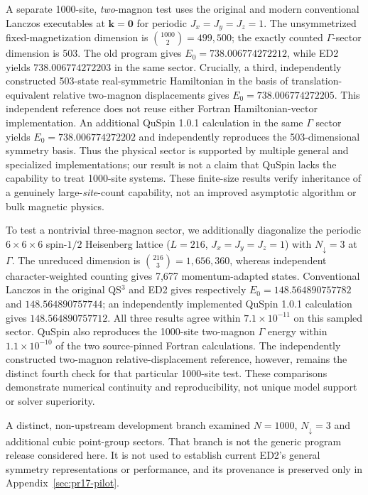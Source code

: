 \documentclass[preprint,12pt,nopreprintline]{elsarticle}
\begin{document}
A separate 1000-site, \emph{two}-magnon test uses the
original and modern conventional Lanczos executables
at $\bm k=\bm0$ for periodic $J_x=J_y=J_z=1$.
The unsymmetrized fixed-magnetization dimension is
$\binom{1000}{2}=499{,}500$; the exactly counted
$\Gamma$-sector dimension is 503.
The old program gives $E_0=738.006774272212$, while
ED2 yields $738.006774272203$ in the same sector.
Crucially, a third, independently constructed
503-state real-symmetric Hamiltonian in the basis
of translation-equivalent relative two-magnon
displacements gives $E_0=738.006774272205$.
This independent reference does not reuse either
Fortran Hamiltonian-vector implementation.
An additional QuSpin 1.0.1 calculation in the same
$\Gamma$ sector yields $E_0=738.006774272202$
and independently reproduces the 503-dimensional
symmetry basis. Thus the physical sector is supported
by multiple general and specialized implementations;
our result is not a claim that QuSpin lacks the
capability to treat 1000-site systems.
These finite-size results verify inheritance of
a genuinely large-\emph{site}-count capability,
not an improved asymptotic algorithm or bulk
magnetic physics.


To test a nontrivial three-magnon sector, we additionally
diagonalize the periodic $6\times6\times6$ spin-$1/2$
Heisenberg lattice ($L=216$, $J_x=J_y=J_z=1$)
with $N_\downarrow=3$ at $\Gamma$.
The unreduced dimension is $\binom{216}{3}=1{,}656{,}360$,
whereas independent character-weighted counting gives
7,677 momentum-adapted states. Conventional Lanczos in
the original QS$^3$ and ED2 gives respectively
$E_0=148.564890757782$ and $148.564890757744$;
an independently implemented QuSpin 1.0.1 calculation
gives $148.564890757712$. All three results agree within
$7.1\times10^{-11}$ on this sampled sector.
QuSpin also reproduces the 1000-site two-magnon
$\Gamma$ energy within $1.1\times10^{-10}$ of the
two source-pinned Fortran calculations. The independently
constructed two-magnon relative-displacement reference,
however, remains the distinct fourth check for that
particular 1000-site test. These comparisons demonstrate
numerical continuity and reproducibility, not unique
model support or solver superiority.

A distinct, non-upstream development branch examined
$N=1000$, $N_\downarrow=3$ and additional cubic
point-group sectors. That branch is not the generic
program release considered here. It is not used to
establish current ED2's general symmetry
representations or performance, and its provenance
is preserved only in Appendix~\ref{sec:pr17-pilot}.
\end{document}
